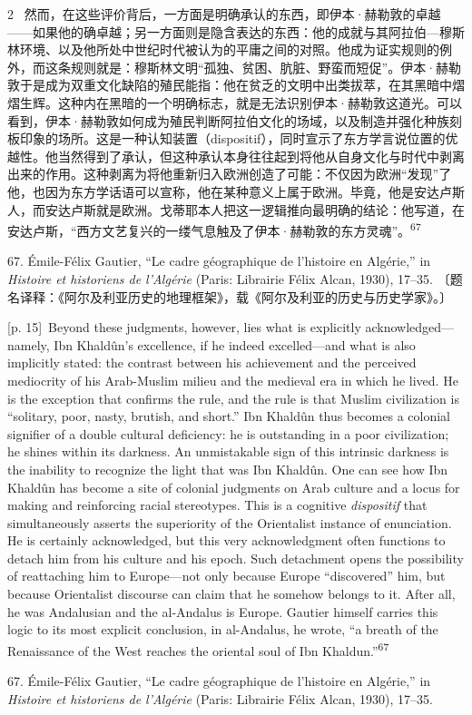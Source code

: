 \documentclass[10pt,a4paper]{article}
\begin{document}
\begin{paracol}{2}
\switchcolumn*
{\scriptsize\color{gray} [p. 15]}\ 然而，在这些评价背后，一方面是明确承认的东西，即伊本·赫勒敦的卓越——如果他的确卓越；另一方面则是隐含表达的东西：他的成就与其阿拉伯—穆斯林环境、以及他所处中世纪时代被认为的平庸之间的对照。他成为证实规则的例外，而这条规则就是：穆斯林文明“孤独、贫困、肮脏、野蛮而短促”。伊本·赫勒敦于是成为双重文化缺陷的殖民能指：他在贫乏的文明中出类拔萃，在其黑暗中熠熠生辉。这种内在黑暗的一个明确标志，就是无法识别伊本·赫勒敦这道光。可以看到，伊本·赫勒敦如何成为殖民判断阿拉伯文化的场域，以及制造并强化种族刻板印象的场所。这是一种认知装置（dispositif），同时宣示了东方学言说位置的优越性。他当然得到了承认，但这种承认本身往往起到将他从自身文化与时代中剥离出来的作用。这种剥离为将他重新归入欧洲创造了可能：不仅因为欧洲“发现”了他，也因为东方学话语可以宣称，他在某种意义上属于欧洲。毕竟，他是安达卢斯人，而安达卢斯就是欧洲。戈蒂耶本人把这一逻辑推向最明确的结论：他写道，在安达卢斯，“西方文艺复兴的一缕气息触及了伊本·赫勒敦的东方灵魂”。\nobreak\textsuperscript{67}\par{\small 67. Émile-Félix Gautier, “Le cadre géographique de l’histoire en Algérie,” in \textit{Histoire et historiens de l’Algérie} (Paris: Librairie Félix Alcan, 1930), 17–35. 〔题名译释：《阿尔及利亚历史的地理框架》，载《阿尔及利亚的历史与历史学家》。〕\par}
\switchcolumn
{\scriptsize\color{gray} [p. 15]}\ Beyond these judgments, however, lies what is explicitly acknowledged—namely, Ibn Khaldûn’s excellence, if he indeed excelled—and what is also implicitly stated: the contrast between his achievement and the perceived mediocrity of his Arab-Muslim milieu and the medieval era in which he lived. He is the exception that confirms the rule, and the rule is that Muslim civilization is “solitary, poor, nasty, brutish, and short.” Ibn Khaldûn thus becomes a colonial signifier of a double cultural deficiency: he is outstanding in a poor civilization; he shines within its darkness. An unmistakable sign of this intrinsic darkness is the inability to recognize the light that was Ibn Khaldûn. One can see how Ibn Khaldûn has become a site of colonial judgments on Arab culture and a locus for making and reinforcing racial stereotypes. This is a cognitive \textit{dispositif} that simultaneously asserts the superiority of the Orientalist instance of enunciation. He is certainly acknowledged, but this very acknowledgment often functions to detach him from his culture and his epoch. Such detachment opens the possibility of reattaching him to Europe—not only because Europe “discovered” him, but because Orientalist discourse can claim that he somehow belongs to it. After all, he was Andalusian and the al-Andalus is Europe. Gautier himself carries this logic to its most explicit conclusion, in al-Andalus, he wrote, “a breath of the Renaissance of the West reaches the oriental soul of Ibn Khaldun.”\nobreak\textsuperscript{67}\par{\small 67. Émile-Félix Gautier, “Le cadre géographique de l’histoire en Algérie,” in \textit{Histoire et historiens de l’Algérie} (Paris: Librairie Félix Alcan, 1930), 17–35.\par}

\end{paracol}
\end{document}
